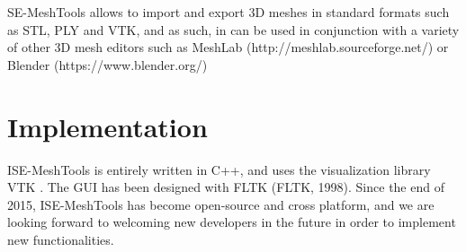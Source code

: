 \documentclass[12pt, a4paper]{book}
\begin{document}
 SE-MeshTools allows to import and export 3D meshes in standard formats such as STL, PLY and VTK, and as such, in can be used in conjunction with a variety of other 3D mesh editors such  as MeshLab (http://meshlab.sourceforge.net/) or Blender (https://www.blender.org/) 
\section {Implementation}
ISE-MeshTools is entirely written in C++, and uses the visualization library VTK \citep{Avila2001}. The GUI has been designed with FLTK (FLTK, 1998). Since the end of 2015, ISE-MeshTools has become open-source and cross platform, and we are looking forward to welcoming new developers in the future in order to implement new functionalities. 

		 
		 
     
	   
		 
		 
		 
		 
		 


\cleardoublepage
{}
{}
  		
\end{document}

